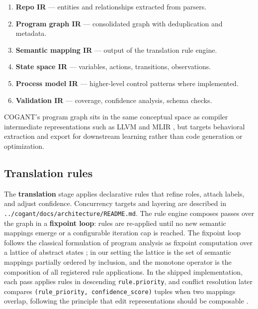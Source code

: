 \documentclass[
]{article}
\providecommand{\tightlist}{%
  \setlength{\itemsep}{0pt}\setlength{\parskip}{0pt}}
\begin{document}
\begin{enumerate}
\def\labelenumi{\arabic{enumi}.}
\tightlist
\item
  \textbf{Repo IR} --- entities and relationships extracted from
  parsers.
\item
  \textbf{Program graph IR} --- consolidated graph with deduplication
  and metadata.
\item
  \textbf{Semantic mapping IR} --- output of the translation rule
  engine.
\item
  \textbf{State space IR} --- variables, actions, transitions,
  observations.
\item
  \textbf{Process model IR} --- higher-level control patterns where
  implemented.
\item
  \textbf{Validation IR} --- coverage, confidence analysis, schema
  checks.
\end{enumerate}

COGANT's program graph sits in the same conceptual space as compiler
intermediate representations such as LLVM \citep{lattner2004llvm} and
MLIR \citep{lattner2021mlir}, but targets behavioral extraction and
export for downstream learning rather than code generation or
optimization.

\subsection{Translation rules}\label{translation-rules}

The \textbf{translation} stage applies declarative rules that refine
roles, attach labels, and adjust confidence. Concurrency targets and
layering are described in
\texttt{../cogant/docs/architecture/README.md}. The rule engine composes
passes over the graph in a \textbf{fixpoint loop}: rules are re-applied
until no new semantic mappings emerge or a configurable iteration cap is
reached. The fixpoint loop follows the classical formulation of program
analysis as fixpoint computation over a lattice of abstract states
\citep{cousot1977abstract}; in our setting the lattice is the set of
semantic mappings partially ordered by inclusion, and the monotone
operator is the composition of all registered rule applications. In the
shipped implementation, each pass applies rules in descending
\texttt{rule.priority}, and conflict resolution later compares
\texttt{(rule\_priority,\ confidence\_score)} tuples when two mappings
overlap, following the principle that edit representations should be
composable \citep{yin2019learning}.
\end{document}
